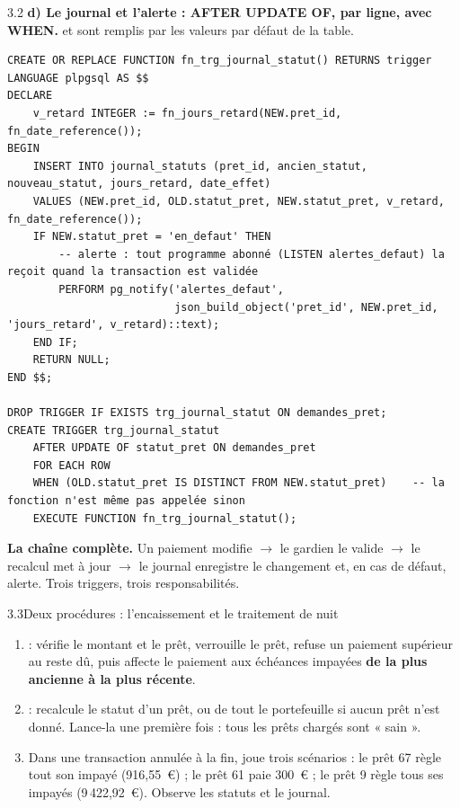 \begin{correction}{3.2}
\textbf{d) Le journal et l'alerte : AFTER UPDATE OF, par ligne, avec WHEN.}  et
 sont remplis par les valeurs par défaut de la table.
\begin{lstlisting}[style=long]
CREATE OR REPLACE FUNCTION fn_trg_journal_statut() RETURNS trigger
LANGUAGE plpgsql AS $$
DECLARE
    v_retard INTEGER := fn_jours_retard(NEW.pret_id, fn_date_reference());
BEGIN
    INSERT INTO journal_statuts (pret_id, ancien_statut, nouveau_statut, jours_retard, date_effet)
    VALUES (NEW.pret_id, OLD.statut_pret, NEW.statut_pret, v_retard, fn_date_reference());
    IF NEW.statut_pret = 'en_defaut' THEN
        -- alerte : tout programme abonné (LISTEN alertes_defaut) la reçoit quand la transaction est validée
        PERFORM pg_notify('alertes_defaut',
                          json_build_object('pret_id', NEW.pret_id, 'jours_retard', v_retard)::text);
    END IF;
    RETURN NULL;
END $$;

DROP TRIGGER IF EXISTS trg_journal_statut ON demandes_pret;
CREATE TRIGGER trg_journal_statut
    AFTER UPDATE OF statut_pret ON demandes_pret
    FOR EACH ROW
    WHEN (OLD.statut_pret IS DISTINCT FROM NEW.statut_pret)    -- la fonction n'est même pas appelée sinon
    EXECUTE FUNCTION fn_trg_journal_statut();
\end{lstlisting}

\textbf{La chaîne complète.} Un paiement modifie  $\rightarrow$ le gardien
le valide $\rightarrow$ le recalcul met à jour  $\rightarrow$ le journal enregistre le
changement et, en cas de défaut, alerte. Trois triggers, trois responsabilités.
\end{correction}

\begin{exercice}{3.3}{Deux procédures : l'encaissement et le traitement de nuit}
\begin{enumerate}[label=\alph*)]
\item {} : vérifie le montant et le prêt, verrouille le
prêt, refuse un paiement supérieur au reste dû, puis affecte le paiement aux échéances impayées
\textbf{de la plus ancienne à la plus récente}.
\item {} : recalcule le statut d'un prêt, ou de tout le portefeuille si
aucun prêt n'est donné. Lance-la une première fois : tous les prêts chargés sont « sain ».
\item Dans une transaction annulée à la fin, joue trois scénarios : le prêt 67 règle tout son impayé
(916,55~€) ; le prêt 61 paie 300~€ ; le prêt 9 règle tous ses impayés (9\,422,92~€). Observe les
statuts et le journal.
\end{enumerate}
\end{exercice}

